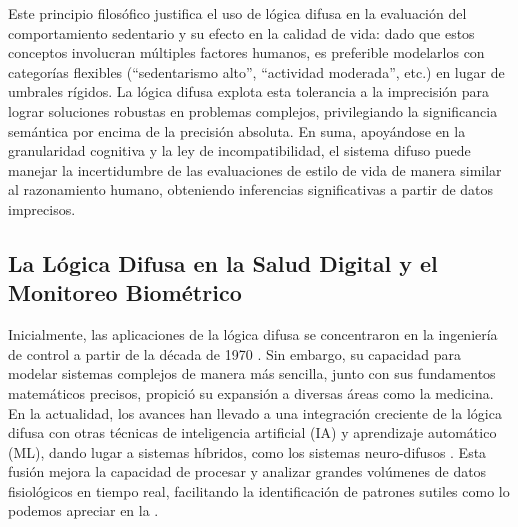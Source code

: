 Este principio filosófico justifica el uso de lógica difusa en la evaluación del comportamiento sedentario y su efecto en la calidad de vida: dado que estos conceptos involucran múltiples factores humanos, es preferible modelarlos con categorías flexibles (``sedentarismo alto'', ``actividad moderada'', etc.) en lugar de umbrales rígidos. La lógica difusa explota esta tolerancia a la imprecisión para lograr soluciones robustas en problemas complejos, privilegiando la significancia semántica por encima de la precisión absoluta. En suma, apoyándose en la granularidad cognitiva y la ley de incompatibilidad, el sistema difuso puede manejar la incertidumbre de las evaluaciones de estilo de vida de manera similar al razonamiento humano, obteniendo inferencias significativas a partir de datos imprecisos.

\subsection{La Lógica Difusa en la Salud Digital y el Monitoreo Biométrico}
\label{subsec:logica_difusa_salud_digital}

Inicialmente, las aplicaciones de la lógica difusa se concentraron en la ingeniería de control a partir de la década de 1970 \citep{Strefezza2009Logica}. Sin embargo, su capacidad para modelar sistemas complejos de manera más sencilla, junto con sus fundamentos matemáticos precisos, propició su expansión a diversas áreas como la medicina. En la actualidad, los avances han llevado a una integración creciente de la lógica difusa con otras técnicas de inteligencia artificial (IA) y aprendizaje automático (ML), dando lugar a sistemas híbridos, como los sistemas neuro-difusos \citep{Ahmadi2018Diseases}. Esta fusión mejora la capacidad de procesar y analizar grandes volúmenes de datos fisiológicos en tiempo real, facilitando la identificación de patrones sutiles como lo podemos apreciar en la .

